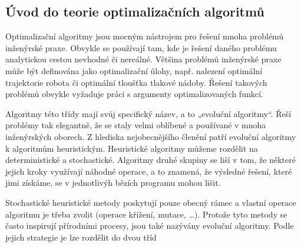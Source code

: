 \documentclass[bc,male,java,dept460]{diploma}		%
\begin{document}
\subsection{Úvod do teorie optimalizačních algoritmů}
\par
Optimalizační algoritmy jsou mocným nástrojem pro řešení mnoha problémů inženýrské praxe. Obvykle se používají tam, kde je řešení daného problému analytickou cestou nevhodné či nereálné.
Většina problémů inženýrské praxe může být definována jako optimalizační úlohy, např. nalezení optimální trajektorie robota či optimální tloušťka tlakové nádoby. Řešení takových problémů obvykle vyžaduje práci s argumenty optimalizovaných funkcí.
\par
Algoritmy této třídy mají svůj specifický název, a to „evoluční algoritmy“. Řeší problémy tak elegantně, že se staly velmi oblíbené a používané v mnoha inženýrských oborech. Z hlediska nejobecnějšího členění patří evoluční algoritmy k algoritmům heuristickým. Heuristické algoritmy můžeme rozdělit na deterministické a stochastické. Algoritmy druhé skupiny se liší v tom, že některé jejich kroky využívají náhodné operace, a to znamená, že výsledné řešení, které jimi získáme, se v jednotlivýh bězích programu  mohou lišit.
\par
Stochastické heuristické metody poskytují pouze obecný rámec a vlastní operace algoritmu je třeba zvolit (operace křížení, mutace, …). Protože tyto metody se často inspirují přírodními procesy, jsou také nazývány evoluční algoritmy. Podle jejich strategie je lze rozdělit do dvou tříd
\end{document}
